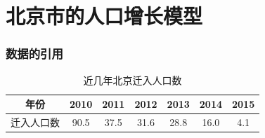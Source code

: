 \documentclass[a4paper]{article}
\begin{document}
\part{北京市的人口增长模型}
\section{数据的引用}
	\begin{table}[H]
		\centering
		\caption{近几年北京迁入人口数}
		\label{beijing_data}
		\begin{tabular}{c|cccccc}
			\hline
			年份				&	2010	&	2011	&	2012	& 2013	&	2014	&	2015	\\
			\hline
			迁入人口数	&	90.5		&	37.5		&	31.6		&	28.8		&	16.0		&	4.1		\\
			\hline
		\end{tabular}
	\end{table}
\end{document}
